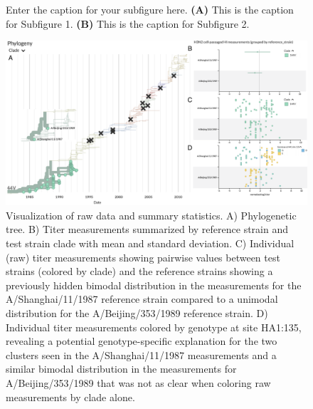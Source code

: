 \documentclass[utf8]{FrontiersinHarvard} %
\begin{document}
\begin{subfigure}
\setcounter{figure}{2}
\setcounter{subfigure}{-1}
    \caption{Enter the caption for your subfigure here. \textbf{(A)} This is the caption for Subfigure 1. \textbf{(B)} This is the caption for Subfigure 2.}
    \label{fig:2}
\end{subfigure}

\begin{figure}[h!]
  \begin{center}
    \includegraphics[width=\textwidth]{figures/figure-3-mockup-for-case-study-2}
  \end{center}
  \caption{
    Visualization of raw data and summary statistics.
A) Phylogenetic tree.
B) Titer measurements summarized by reference strain and test strain clade with mean and standard deviation.
C) Individual (raw) titer measurements showing pairwise values between test strains (colored by clade) and the reference strains showing a previously hidden bimodal distribution in the measurements for the A/Shanghai/11/1987 reference strain compared to a unimodal distribution for the A/Beijing/353/1989 reference strain.
D) Individual titer measurements colored by genotype at site HA1:135, revealing a potential genotype-specific explanation for the two clusters seen in the A/Shanghai/11/1987 measurements and a similar bimodal distribution in the measurements for A/Beijing/353/1989 that was not as clear when coloring raw measurements by clade alone.}\label{fig:3}
\end{figure}

\end{document}
